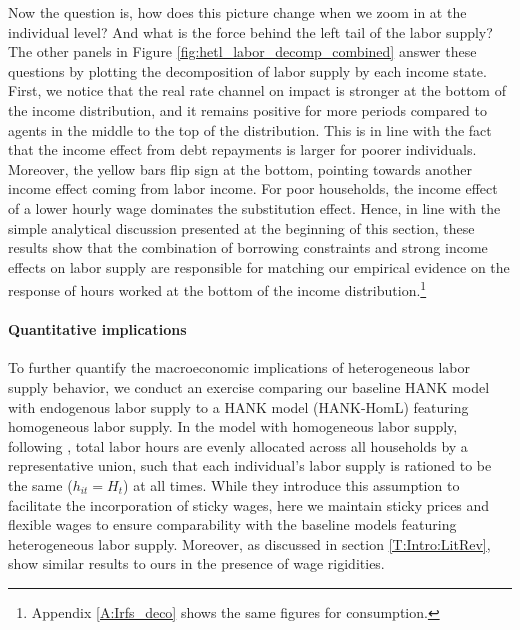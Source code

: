 \documentclass[a4paper,12pt]{article}%
\begin{document}
Now the question is, how does this picture change when we zoom in at the individual level? And what is the force behind the left tail of the labor supply? 
The other panels in Figure \ref{fig:hetl_labor_decomp_combined} answer these questions by plotting the decomposition of labor supply by each income state. First, we notice that the real rate channel on impact is stronger at the bottom of the income distribution, and it remains positive for more periods compared to agents in the middle to the top of the distribution. 
This is in line with the fact that the income effect from debt repayments is larger for poorer individuals. 
Moreover, the yellow bars flip sign at the bottom, pointing towards another income effect coming from labor income. 
For poor households, the income effect of a lower hourly wage dominates the substitution effect. Hence, in line with the simple analytical discussion presented at the beginning of this section, these results show that the combination of borrowing constraints and strong income effects on labor supply are responsible for matching our empirical evidence on the response of hours worked at the bottom of the income distribution.\footnote{
Appendix \ref{A:Irfs_deco} shows the same figures for consumption.}


\paragraph{Quantitative implications}  
To further quantify the macroeconomic implications of heterogeneous labor supply behavior, we conduct an exercise comparing our baseline HANK model with endogenous labor supply to a HANK model (HANK-HomL) featuring homogeneous labor supply. In the model with homogeneous labor supply, following \citet{IKC}, total labor hours are evenly allocated across all households by a representative union, such that each individual's labor supply is rationed to be the same ($h_{it} = H_t$) at all times.
While they introduce this assumption to facilitate the incorporation of sticky wages, here we maintain sticky prices and flexible wages to ensure comparability with the baseline models featuring heterogeneous labor supply. Moreover, as discussed in section \ref{T:Intro:LitRev}, \citet{Gerkeetal24} show similar results to ours in the presence of wage rigidities.
\end{document}
